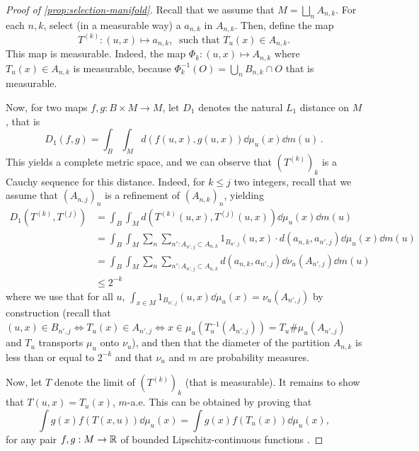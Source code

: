 \begin{proof}[Proof of \cref{prop:selection-manifold}]
Recall that we assume that $M = \bigsqcup_n A_{n,k}$. For each $n,k$, select (in a measurable way) a $a_{n,k}$ in $A_{n,k}$. Then, define the map
\begin{equation}
    T^{(k)} : (u,x) \mapsto a_{n,k},\ \text{ such that } T_u(x) \in A_{n,k}.
\end{equation}
This map is measurable. Indeed, the map $\Phi_k : (u,x) \mapsto A_{n,k}$ where $T_u(x) \in A_{n,k}$ is measurable, because $\Phi_k^{-1}(O) = \bigcup_n B_{n,k} \cap O$ that is measurable.

Now, for two maps $f,g : B \times M \to M$, let $D_1$ denotes the natural $L_1$ distance on $M$, that is
\begin{equation}
    D_1(f,g) = \int_B \int_M d(f(u,x), g(u,x)) \dd \mu_u(x)  \dd m(u)\,.
\end{equation}
This yields a complete metric space, and we can observe that $(T^{(k)})_k$ is a Cauchy sequence for this distance. Indeed, for $k \leq j$ two integers, recall that we assume that $(A_{n,j})_n$ is a refinement of $(A_{n,k})_n$, yielding
\begin{align*}
    D_1(T^{(k)}, T^{(j)}) &= \int_{B} \int_M d(T^{(k)}(u,x), T^{(j)}(u,x)) \dd \mu_u (x) \dd m(u) \\
    &= \int_{B} \int_M \sum_n \sum_{n' : A_{n',j} \subset  A_{n,k}}  1_{B_{n',j}}(u,x) \cdot d(a_{n,k}, a_{n',j}) \dd \mu_u(x) \dd m(u) \\
    &= \int_B \int_M \sum_n \sum_{n' : A_{n',j} \subset  A_{n,k}} d(a_{n,k},a_{n',j}) \dd \nu_u(A_{n',j}) \dd m(u) \\
    &\leq 2^{-k}
\end{align*}
where we use that for all $u$, $\int_{x \in M} 1_{B_{n',j}}(u,x) \dd \mu_u(x) = \nu_u(A_{n',j})$ by construction (recall that $(u,x) \in B_{n',j} \Leftrightarrow T_u(x) \in A_{n',j} \Leftrightarrow x \in \mu_u(T_u^{-1}(A_{n',j})) = T_u \# \mu_u(A_{n',j})$ and $T_u$  transports $\mu_u$ onto $\nu_u$), and then that the diameter of the partition $A_{n,k}$ is less than or equal to $2^{-k}$ and that $\nu_u$ and $m$ are probability measures.

Now, let $T$ denote the limit of $(T^{(k)})_k$ (that is measurable). It remains to show that $T(u,x) = T_u(x)$, $m$-a.e. This can be obtained by proving that
\begin{equation}
    \int g(x) f(T(x,u)) \dd \mu_u(x) = \int g(x) f(T_u(x)) \dd \mu_u(x),
\end{equation}
for any pair $f,g : M \to \mathbb{R}$ of bounded Lipschitz-continuous functions \cite[Lemma 2.24]{van2000asymptotic}.


\end{proof}
